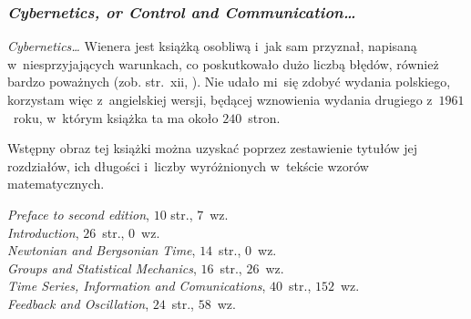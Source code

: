 \documentclass[10pt,t]{beamer}
\begin{document}
\begin{frame}
  \frametitle{\textit{Cybernetics, or Control and
      Communication\ldots}}


  \textit{Cybernetics\ldots} Wienera jest książką osobliwą i~jak sam przyznał,
  napisaną w~niesprzyjających warunkach, co poskutkowało dużo liczbą błędów,
  również bardzo poważnych (zob. str.~xii,
  \parencite{Wiener-Cybernetics-Second-edition-Pub-2016}). Nie udało mi~się
  zdobyć wydania polskiego, korzystam więc z~angielskiej wersji, będącej
  wznowienia wydania drugiego z~$1961$~roku, w~którym książka ta ma około
  $240$~stron.

  Wstępny obraz tej książki można uzyskać poprzez zestawienie tytułów jej
  rozdziałów, ich długości i~liczby wyróżnionych w~tekście wzorów
  matematycznych.

  \textit{Preface to second edition}, $10$ str., $7$~wz. \\
  \textit{Introduction}, $26$~str., $0$~wz. \\
  \textit{Newtonian and Bergsonian Time}, $14$~str., $0$~wz. \\
  \textit{Groups and Statistical Mechanics}, $16$~str., $26$~wz. \\
  \textit{Time Series, Information and Comunications}, $40$~str.,
  $152$~wz. \\
  \textit{Feedback and Oscillation}, $24$~str., $58$~wz. \\

\end{frame}
\end{document}
